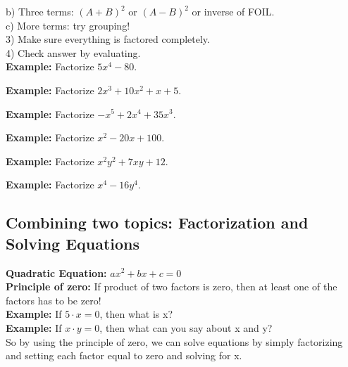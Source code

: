 \documentclass{ximera}
\begin{document}
b) Three terms: $(A+B)^2$ or $(A-B)^2$ or inverse of FOIL.\\

c) More terms: try grouping!\\

3) Make sure everything is factored completely.\\

4) Check answer by evaluating. \\

{\bf Example:} Factorize $5x^4 - 80$.\\
\vspace{3 cm}

{\bf Example:} Factorize $2x^3 + 10x^2 + x + 5$.\\
\vspace{3 cm}

{\bf Example:} Factorize $-x^5 + 2x^4 + 35x^3$.\\
\vspace{3 cm}

{\bf Example:} Factorize $x^2 -20x + 100 $.\\
\vspace{2 cm}

{\bf Example:} Factorize $x^2y^2 + 7xy +12$.\\
\vspace{3 cm}

{\bf Example:} Factorize $x^4 - 16y^4$.\\
\vspace{3 cm}

\subsection{Combining two topics: Factorization and Solving Equations}

{\bf Quadratic Equation:} $ax^2 + bx + c = 0$\\

{\bf Principle of zero:} If product of two factors is zero, then at least one of the factors has to be zero!\\

{\bf Example:} If $5 \cdot x = 0$, then what is x?\\

{\bf Example:} If $ x \cdot y = 0$, then what can you say about x and y?\\

So by using the principle of zero, we can solve equations by simply factorizing and setting each factor equal to zero and solving for x.\\
\end{document}
